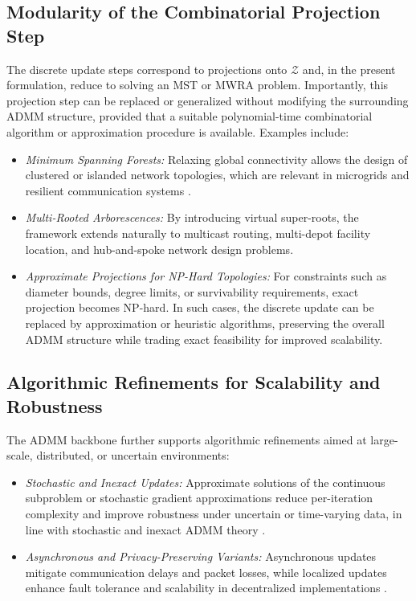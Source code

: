 \documentclass[11pt,a4paper]{article}
\theoremstyle{plain}
\theoremstyle{definition}
\theoremstyle{remark}
\begin{document}
	\subsection{Modularity of the Combinatorial Projection Step}
	The discrete update steps correspond to projections onto $\mathcal{Z}$ and, in
	the present formulation, reduce to solving an MST or MWRA problem.
	Importantly, this projection step can be replaced or generalized without
	modifying the surrounding ADMM structure, provided that a suitable
	polynomial-time combinatorial algorithm or approximation procedure is
	available.
	Examples include:
	\begin{itemize}
		\item \emph{Minimum Spanning Forests:}
		Relaxing global connectivity allows the design of clustered or islanded
		network topologies, which are relevant in microgrids and resilient
		communication systems \cite{korte2018combinatorial}.
		
		\item \emph{Multi-Rooted Arborescences:}
		By introducing virtual super-roots, the framework extends naturally to
		multicast routing, multi-depot facility location, and hub-and-spoke network
		design problems.
		
		\item \emph{Approximate Projections for NP-Hard Topologies:}
		For constraints such as diameter bounds, degree limits, or survivability
		requirements, exact projection becomes NP-hard.
		In such cases, the discrete update can be replaced by approximation or
		heuristic algorithms, preserving the overall ADMM structure while trading
		exact feasibility for improved scalability.
	\end{itemize}
	
	\subsection{Algorithmic Refinements for Scalability and Robustness}
	The ADMM backbone further supports algorithmic refinements aimed at large-scale,
	distributed, or uncertain environments:
	\begin{itemize}
		\item \emph{Stochastic and Inexact Updates:}
		Approximate solutions of the continuous subproblem or stochastic gradient
		approximations reduce per-iteration complexity and improve robustness under
		uncertain or time-varying data, in line with stochastic and inexact ADMM
		theory \cite{bai2025inexact,boyd2011distributed}.
		
		\item \emph{Asynchronous and Privacy-Preserving Variants:}
		Asynchronous updates mitigate communication delays and packet losses, while
		localized updates enhance fault tolerance and scalability in decentralized
		implementations \cite{jin2025stochastic}.
	\end{itemize}
	
\end{document}
